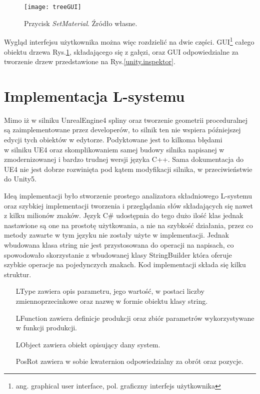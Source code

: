 \documentclass[12pt]{report}
\renewcommand{\figurename}{Rys.}
\begin{document}
\begin{sloppypar}
\begin{figure}[!htb]
\centering
\texttt{[image: treeGUI]} 
\caption{Przycisk \textit{SetMaterial}. Źródło własne. \label{unity.treeGUI}}
\end{figure}


Wygląd interfejsu użytkownika można więc rozdzielić na dwie części. GUI\footnote{ang. graphical user interface, pol. graficzny interfejs użytkownika} całego obiektu drzewa \figurename\ref{unity.treeGUI}, składającego się z gałęzi, oraz GUI odpowiedzialne za tworzenie drzew przedstawione na \figurename\ref{unity.inspektor}.

\section{Implementacja L-systemu}

Mimo iż w silniku UnrealEngine4 spliny oraz tworzenie geometrii proceduralnej są zaimplementowane przez developerów, to silnik ten nie wspiera późniejszej edycji tych obiektów w edytorze. Podyktowane jest to kilkoma błędami \\w silniku UE4 oraz skomplikowaniem samej budowy silnika napisanej w zmodernizowanej i bardzo trudnej wersji języka C++. Sama dokumentacja do UE4 nie jest dobrze rozwinięta pod kątem modyfikacji silnika, w przeciwieństwie do Unity5. 

Ideą implementacji było stworzenie prostego analizatora składniowego L-systemu oraz szybkiej implementacji tworzenia i przeglądania słów składających się nawet z kilku milionów znaków. Język C\# udostępnia do tego dużo ilość klas jednak  nastawione są one na prostotę użytkowania, a nie na szybkość działania, przez co metody zawarte w tym języku nie zostały użyte w implementacji. Jednak wbudowana klasa string nie jest przystosowana do operacji na napisach, co spowodowało  skorzystanie z wbudowanej klasy StringBuilder \cite{stringBuilder} która oferuje szybkie operacje na pojedynczych znakach.
Kod implementacji składa się kilku struktur.
\begin{itemize}[labelindent=5.5em,labelsep=1cm,leftmargin=*]
\item[LType] zawiera opis parametru, jego wartość, w postaci liczby zmiennoprzecinkowe oraz nazwę w formie obiektu klasy string.
\item[LFunction] zawiera definicje produkcji oraz zbiór parametrów wykorzystywane w funkcji produkcji.
\item[LObject] zawiera obiekt opisujący dany system.
\item[PosRot] zawiera w sobie kwaternion odpowiedzialny za obrót oraz pozycje.
\end{itemize}


\end{sloppypar}
\end{document}
